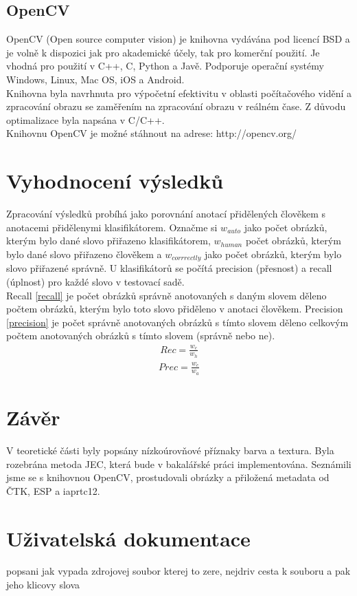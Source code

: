 \documentclass[czech,BP]{thesiskiv}
\begin{document}
\section{OpenCV}
OpenCV (Open source computer vision) je knihovna vydávána pod licencí BSD a je volně k dispozici jak pro akademické účely, tak pro komerční použití. Je vhodná pro použití v C++, C, Python a Javě. Podporuje operační systémy Windows, Linux, Mac OS, iOS a Android.
\\
Knihovna byla navrhnuta pro výpočetní efektivitu v oblasti počítačového vidění a zpracování obrazu se zaměřením na zpracování obrazu v reálném čase. Z důvodu optimalizace byla napsána v C/C++. 
\\
Knihovnu OpenCV je možné stáhnout na adrese: http://opencv.org/


\chapter{Vyhodnocení výsledků}
Zpracování výsledků probíhá jako porovnání anotací přidělených člověkem s anotacemi přidělenymi klasifikátorem. Označme si $w_{auto}$ jako počet obrázků, kterým bylo dané slovo přiřazeno klasifikátorem, $w_{human}$ počet obrázků, kterým bylo dané slovo přiřazeno člověkem a $w_{corrrectly}$ jako počet obrázků, kterým bylo slovo přiřazené správně. U klasifikátorů se počítá precision (přesnost) a recall (úplnost) pro každé slovo v testovací sadě.\\
Recall \eqref{recall} je počet obrázků správně anotovaných s daným slovem děleno počtem obrázků, kterým bylo toto slovo přiděleno v anotaci člověkem. Precision \eqref{precision} je počet správně anotovaných obrázků s tímto slovem děleno celkovým počtem anotovaných obrázků s tímto slovem (správně nebo ne). \cite{Result_A_A}
\begin{align}
   \label{recall} Rec = \frac{w_c}{w_h}
\end{align}
\begin{align}
   \label{precision} Prec = \frac{w_c}{w_a}
\end{align}


\chapter{Závěr}
V teoretické části byly popsány nízkoúrovňové příznaky barva a textura. Byla rozebrána metoda JEC, která bude v bakalářské práci implementována. Seznámili jsme se s knihovnou OpenCV, prostudovali obrázky a přiložená metadata od ČTK, ESP a iaprtc12. 

\chapter{Uživatelská dokumentace}
popsani jak vypada zdrojovej soubor kterej to zere, nejdriv cesta k souboru a pak jeho klicovy slova
 
% 
%

{\raggedright\small

}
\end{document}
